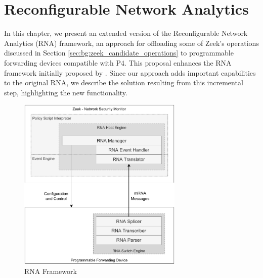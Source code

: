 \chapter{Reconfigurable Network Analytics}
\label{cap:rna}



In this chapter, we present an extended version of the Reconfigurable Network Analytics (RNA) framework, an approach for offloading some of Zeek's operations discussed in Section \ref{sec:bg:zeek_candidate_operations} to programmable forwarding devices compatible with P4. This proposal enhances the RNA framework initially proposed by . Since our approach adds important capabilities to the original RNA, we describe the solution resulting from this incremental step, highlighting the new functionality.

\begin{figure}[h]
    \caption{RNA Framework}
    \begin{center}
        \includegraphics[width=0.7\textwidth]{images/arch_high_level.pdf}  
    \end{center}
    \label{fig:arch_high_level}
\end{figure}

